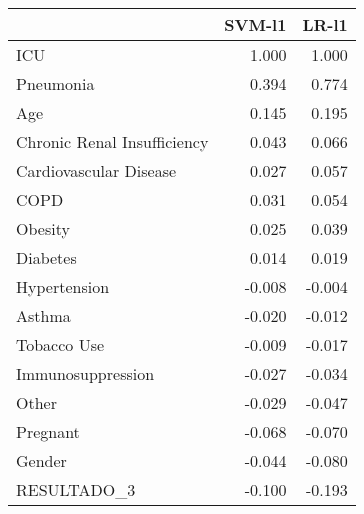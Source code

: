 \begin{tabular}{lrr}
\toprule
{} &  SVM-l1 &  LR-l1 \\
\midrule
ICU                         &   1.000 &  1.000 \\
Pneumonia                   &   0.394 &  0.774 \\
Age                         &   0.145 &  0.195 \\
Chronic Renal Insufficiency &   0.043 &  0.066 \\
Cardiovascular Disease      &   0.027 &  0.057 \\
COPD                        &   0.031 &  0.054 \\
Obesity                     &   0.025 &  0.039 \\
Diabetes                    &   0.014 &  0.019 \\
Hypertension                &  -0.008 & -0.004 \\
Asthma                      &  -0.020 & -0.012 \\
Tobacco Use                 &  -0.009 & -0.017 \\
Immunosuppression           &  -0.027 & -0.034 \\
Other                       &  -0.029 & -0.047 \\
Pregnant                    &  -0.068 & -0.070 \\
Gender                      &  -0.044 & -0.080 \\
RESULTADO\_3                 &  -0.100 & -0.193 \\
\bottomrule
\end{tabular}

